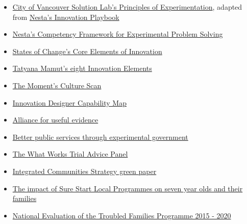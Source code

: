 \documentclass[openany]{book}
\begin{document}
\begin{itemize}
\item
  \href{https://vancouver.ca/files/cov/navigating-complexity-solutions-lab.pdf}{City of Vancouver Solution Lab's Principles of Experimentation}, adapted from \href{https://www.nesta.org.uk/toolkit/playbook-for-innovation-learning/}{Nesta's Innovation Playbook}
\item
  \href{https://media.nesta.org.uk/documents/Nesta_CompetencyFramework_Guide_July2019.pdf}{Nesta's Competency Framework for Experimental Problem Solving}
\item
  \href{https://states-of-change.org/assets/images/StatesofChange_Curriculum_Craft.png}{States of Change's Core Elements of Innovation}
\item
  \href{https://gww.gov.bc.ca/sites/default/files/group/file/2019/0207/remixtatyanamamutleadingacultureofinnovationlowres.pdf}{Tatyana Mamut's eight Innovation Elements}
\item
  \href{https://info.themoment.is/innovationculture}{The Moment's Culture Scan}
\item
  \href{https://cdn2.hubspot.net/hubfs/3903042/themoment_InnovationDesignersCapabilityMap.pdf}{Innovation Designer Capability Map}
\item
  \href{https://www.alliance4usefulevidence.org/}{Alliance for useful evidence}
\item
  \href{https://www.alliance4usefulevidence.org/publication/better-public-services-through-experimental-government/}{Better public services through experimental government}
\item
  \href{https://www.gov.uk/government/publications/cross-government-trial-advice-panel-role-and-membership}{The What Works Trial Advice Panel}
\item
  \href{https://www.gov.uk/government/consultations/integrated-communities-strategy-green-paper}{Integrated Communities Strategy green paper}
\item
  \href{https://assets.publishing.service.gov.uk/government/uploads/system/uploads/attachment_data/file/495329/The_impact_of_Sure_Start_local_programmes_on_7-year-olds_and_their_families.pdf}{The impact of Sure Start Local Programmes on seven year olds and their families}
\item
  \href{https://assets.publishing.service.gov.uk/government/uploads/system/uploads/attachment_data/file/786891/National_evaluation_of_the_Troubled_Families_Programme_2015_to_2020_family_outcomes___national_and_local_datasets_part_4.pdf}{National Evaluation of the Troubled Families Programme 2015 - 2020}

\end{itemize}
\end{document}
